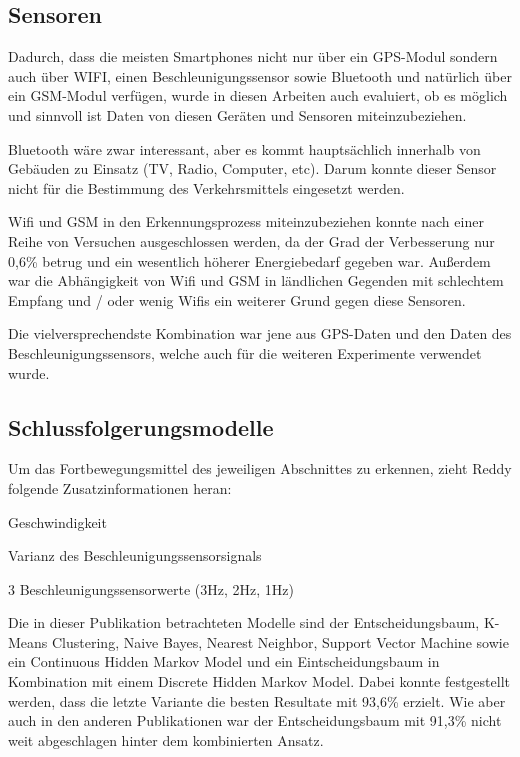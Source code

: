 \subsection{Sensoren}
Dadurch, dass die meisten Smartphones nicht nur über ein GPS-Modul sondern auch über WIFI, einen Beschleunigungssensor sowie Bluetooth und natürlich über ein GSM-Modul verfügen, wurde in diesen Arbeiten auch evaluiert, ob es möglich und sinnvoll ist Daten von diesen Geräten und Sensoren miteinzubeziehen. 

Bluetooth  wäre zwar interessant, aber es kommt hauptsächlich innerhalb von Gebäuden zu Einsatz (TV, Radio, Computer, etc). Darum konnte dieser Sensor nicht für die Bestimmung des Verkehrsmittels eingesetzt werden. 

Wifi und GSM in den Erkennungsprozess miteinzubeziehen konnte nach einer Reihe von Versuchen ausgeschlossen werden, da der Grad der Verbesserung nur 0,6\% betrug und ein wesentlich höherer Energiebedarf gegeben war. Außerdem war die Abhängigkeit von Wifi und GSM in ländlichen Gegenden mit schlechtem Empfang und / oder wenig Wifis ein weiterer Grund gegen diese Sensoren.

Die vielversprechendste Kombination war jene aus GPS-Daten und den Daten des Beschleunigungssensors, welche auch  für die weiteren Experimente verwendet wurde.

\subsection{Schlussfolgerungsmodelle}
Um das Fortbewegungsmittel des jeweiligen Abschnittes zu erkennen, zieht Reddy folgende Zusatzinformationen heran:

\begin{pitemize}
\item Geschwindigkeit
\item Varianz des Beschleunigungssensorsignals
\item 3 Beschleunigungssensorwerte (3Hz, 2Hz, 1Hz)
\end{pitemize}

Die in dieser Publikation betrachteten Modelle sind der Entscheidungsbaum, K-Means Clustering, Naive Bayes, Nearest Neighbor, Support Vector Machine sowie ein Continuous Hidden Markov Model und ein Eintscheidungsbaum in Kombination mit einem Discrete Hidden Markov Model. Dabei konnte festgestellt werden, dass die letzte Variante die besten Resultate mit 93,6\% erzielt. Wie aber auch in den anderen Publikationen war der Entscheidungsbaum mit 91,3\% nicht weit abgeschlagen hinter dem kombinierten Ansatz.


